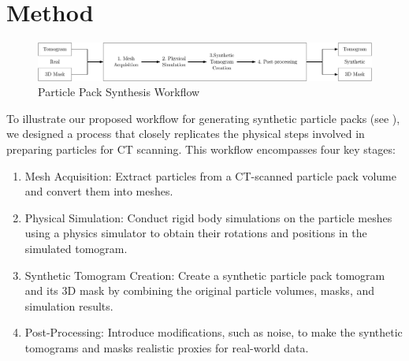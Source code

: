 \documentclass[preprint,12pt]{elsarticle}
\begin{document}
\section{Method}\label{sec:method}
\begin{figure}
    \includegraphics[width=\textwidth]{figures/pdf/synthesis-workflow.pdf}
    \caption{Particle Pack Synthesis Workflow}
    \label{fig:workflow}
\end{figure}
To illustrate our proposed workflow for generating synthetic particle packs (see ), we designed a process that closely replicates the physical steps involved in preparing particles for CT scanning. This workflow encompasses four key stages:
\par
\begin{enumerate}
    \item Mesh Acquisition: Extract particles from a CT-scanned particle pack volume and convert them into meshes.
    \item Physical Simulation: Conduct rigid body simulations on the particle meshes using a physics simulator to obtain their rotations and positions in the simulated tomogram.
    \item Synthetic Tomogram Creation: Create a synthetic particle pack tomogram and its 3D mask by combining the original particle volumes, masks, and simulation results.
    \item Post-Processing: Introduce modifications, such as noise, to make the synthetic tomograms and masks realistic proxies for real-world data.
\end{enumerate}
\end{document}
